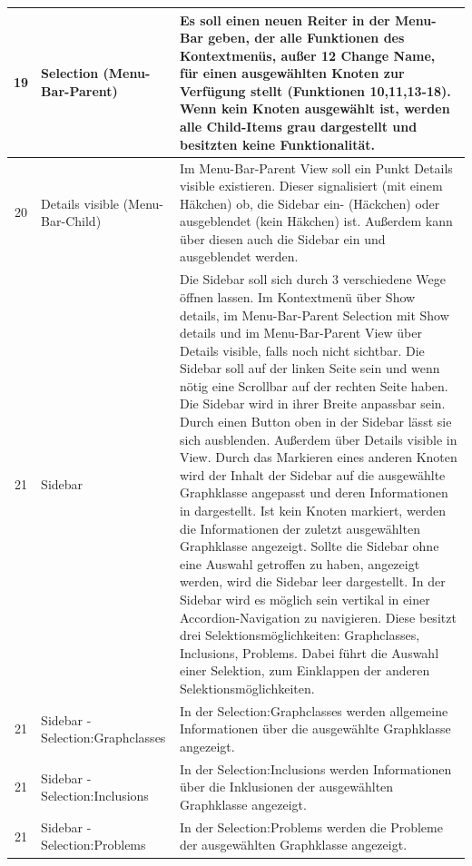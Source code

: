 \documentclass[10pt,a4paper]{article}
\begin{document}
\begin{tabular}{|c|p{5cm}|p{10cm}|}
\hline 
19 & Selection (Menu-Bar-Parent) & Es soll einen neuen Reiter in der Menu-Bar geben, der alle Funktionen des Kontextmenüs, außer 12 Change Name, für einen ausgewählten Knoten zur Verfügung stellt (Funktionen 10,11,13-18). Wenn kein Knoten ausgewählt ist, werden alle Child-Items grau dargestellt und besitzten keine Funktionalität.  \\
\hline
20 & Details visible (Menu-Bar-Child) & Im Menu-Bar-Parent View soll ein Punkt Details visible existieren. Dieser signalisiert (mit einem Häkchen) ob, die Sidebar ein- (Häckchen) oder ausgeblendet (kein Häkchen) ist. Außerdem kann über diesen auch die Sidebar ein und ausgeblendet werden.\\ 
\hline
21 & Sidebar & Die Sidebar soll sich durch 3 verschiedene Wege öffnen lassen. Im Kontextmenü über Show details, im Menu-Bar-Parent Selection mit Show details und im Menu-Bar-Parent View über Details visible, falls noch nicht sichtbar. Die Sidebar soll auf der linken Seite sein und wenn nötig eine Scrollbar auf der rechten Seite haben. Die Sidebar wird in ihrer Breite anpassbar sein. Durch einen Button oben in der Sidebar lässt sie sich ausblenden. Außerdem über Details visible in View. Durch das Markieren eines anderen Knoten wird der Inhalt der Sidebar auf die ausgewählte Graphklasse angepasst und deren Informationen in dargestellt. Ist kein Knoten markiert, werden die Informationen der zuletzt ausgewählten Graphklasse angezeigt. Sollte die Sidebar ohne eine Auswahl getroffen zu haben, angezeigt werden, wird die Sidebar leer dargestellt. In der Sidebar wird es möglich sein vertikal in einer Accordion-Navigation zu navigieren. Diese besitzt drei Selektionsmöglichkeiten: Graphclasses, Inclusions, Problems. Dabei führt die Auswahl einer Selektion, zum Einklappen der anderen Selektionsmöglichkeiten. \\
\hline
21 & Sidebar - Selection:Graphclasses  & In der Selection:Graphclasses werden allgemeine Informationen über die ausgewählte Graphklasse angezeigt. \\
\hline
21 & Sidebar - Selection:Inclusions & In der Selection:Inclusions werden Informationen über die Inklusionen der ausgewählten Graphklasse angezeigt. \\
\hline
21 & Sidebar - Selection:Problems & In der Selection:Problems werden die Probleme der ausgewählten Graphklasse angezeigt. \\
\hline
\end{tabular} \newpage
\end{document}
